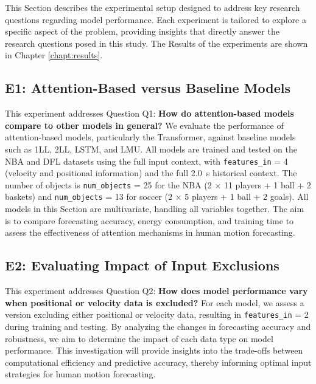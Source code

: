 This Section describes the experimental setup designed to address key research questions regarding model performance. Each experiment is tailored to explore a specific aspect of the problem, providing insights that directly answer the research questions posed in this study. The Results of the experiments are shown in Chapter \ref{chapt:results}.

\subsection{E1: Attention-Based versus Baseline Models}
\label{exp:e1}
This experiment addresses Question Q1: \textbf{How do attention-based models compare to other models in general?} We evaluate the performance of attention-based models, particularly the Transformer, against baseline models such as 1LL, 2LL, LSTM, and LMU. All models are trained and tested on the NBA and DFL datasets using the full input context, with \texttt{features\_in} = 4 (velocity and positional information) and the full \SI{2.0}{\second} historical context. The number of objects is \texttt{num\_objects} = 25 for the NBA (2 × 11 players + 1 ball + 2 baskets) and \texttt{num\_objects} = 13 for soccer (2 × 5 players + 1 ball + 2 goals). All models in this Section are multivariate, handling all variables together. The aim is to compare forecasting accuracy, energy consumption, and training time to assess the effectiveness of attention mechanisms in human motion forecasting.

\subsection{E2: Evaluating Impact of Input Exclusions}
\label{exp:e2}
This experiment addresses Question Q2: \textbf{How does model performance vary when positional or velocity data is excluded?} For each model, we assess a version excluding either positional or velocity data, resulting in \texttt{features\_in} = 2 during training and testing. By analyzing the changes in forecasting accuracy and robustness, we aim to determine the impact of each data type on model performance. This investigation will provide insights into the trade-offs between computational efficiency and predictive accuracy, thereby informing optimal input strategies for human motion forecasting.



